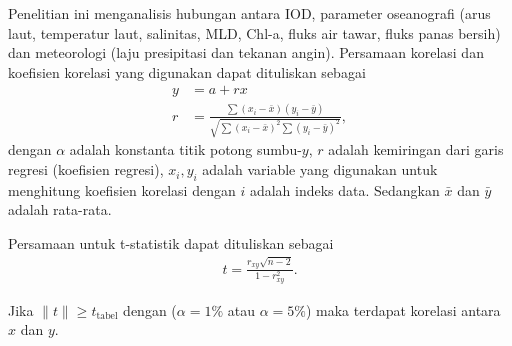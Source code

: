 \begin{spacing}{1.5}
		Penelitian ini menganalisis hubungan antara IOD, parameter oseanografi (arus laut, temperatur laut, salinitas, MLD, Chl-a, fluks air tawar, fluks panas bersih) dan meteorologi (laju presipitasi dan tekanan angin). Persamaan korelasi dan koefisien korelasi yang digunakan dapat dituliskan sebagai \cite{Haditiar2020}
		\begin{equation}
			\begin{aligned}
				y &= a+rx\\
				r &= \frac{\sum (x_i - \bar{x})(y_i - \bar{y})}{\sqrt{\sum (x_i-\bar{x})^2\sum (y_i-\bar{y})^2}},
			\end{aligned}
		\end{equation}
		dengan $\alpha$ adalah konstanta titik potong sumbu-$y$, $r$ adalah kemiringan dari garis regresi (koefisien regresi), $x_i, y_i$ adalah variable yang digunakan untuk menghitung koefisien korelasi dengan $i$ adalah indeks data. Sedangkan $\bar{x}$ dan $\bar{y}$ adalah rata-rata. 
		
		Persamaan untuk t-statistik dapat dituliskan sebagai
		\begin{equation}
			\begin{aligned}
				t=\frac{r_{xy}\sqrt{n-2}}{1-r^2_{xy}}.
			\end{aligned}
		\end{equation}

		Jika $\|t\|\geq t_{\text{tabel}}$ dengan ($\alpha=1\%$ atau $\alpha=5\%$) maka terdapat korelasi antara $x$ dan $y$.
\end{spacing}
\vspace{-0.5pc}
